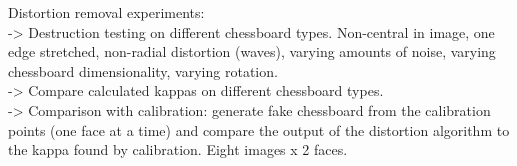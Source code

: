 Distortion removal experiments:\\
-> Destruction testing on different chessboard types. Non-central in image, one edge stretched, non-radial distortion (waves), varying amounts of noise, varying chessboard dimensionality, varying rotation.\\
-> Compare calculated kappas on different chessboard types.\\
-> Comparison with calibration: generate fake chessboard from the calibration points (one face at a time) and compare the output of the distortion algorithm to the kappa found by calibration. Eight images x 2 faces.\\

